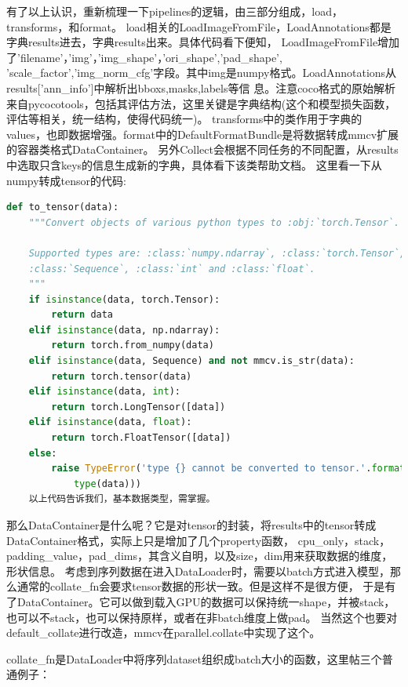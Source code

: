\documentclass[UTF8]{ctexart}
\begin{document}
有了以上认识，重新梳理一下pipelines的逻辑，由三部分组成，load，transforms，和format。
load相关的LoadImageFromFile，LoadAnnotations都是字典results进去，字典results出来。具体代码看下便知，
LoadImageFromFile增加了'filename'，'img'，'img\_shape'，'ori\_shape','pad\_shape',
'scale\_factor','img\_norm\_cfg'字段。其中img是numpy格式。LoadAnnotations从results['ann\_info']中解析出bboxs,masks,labels等信
息。注意coco格式的原始解析来自pycocotools，包括其评估方法，这里关键是字典结构(这个和模型损失函数，评估等相关，统一结构，使得代码统一)。
transforms中的类作用于字典的values，也即数据增强。format中的DefaultFormatBundle是将数据转成mmcv扩展的容器类格式DataContainer。
另外Collect会根据不同任务的不同配置，从results中选取只含keys的信息生成新的字典，具体看下该类帮助文档。
这里看一下从numpy转成tensor的代码:

\lstset{style=mystyle}
\begin{lstlisting}[language=Python]
def to_tensor(data):
    """Convert objects of various python types to :obj:`torch.Tensor`.

    Supported types are: :class:`numpy.ndarray`, :class:`torch.Tensor`,
    :class:`Sequence`, :class:`int` and :class:`float`.
    """
    if isinstance(data, torch.Tensor):
        return data
    elif isinstance(data, np.ndarray):
        return torch.from_numpy(data)
    elif isinstance(data, Sequence) and not mmcv.is_str(data):
        return torch.tensor(data)
    elif isinstance(data, int):
        return torch.LongTensor([data])
    elif isinstance(data, float):
        return torch.FloatTensor([data])
    else:
        raise TypeError('type {} cannot be converted to tensor.'.format(
			type(data)))
	以上代码告诉我们，基本数据类型，需掌握。
\end{lstlisting}

那么DataContainer是什么呢？它是对tensor的封装，将results中的tensor转成DataContainer格式，实际上只是增加了几个property函数，
cpu\_only，stack，padding\_value，pad\_dims，其含义自明，以及size，dim用来获取数据的维度，形状信息。
考虑到序列数据在进入DataLoader时，需要以batch方式进入模型，那么通常的collate\_fn会要求tensor数据的形状一致。但是这样不是很方便，
于是有了DataContainer。它可以做到载入GPU的数据可以保持统一shape，并被stack，也可以不stack，也可以保持原样，或者在非batch维度上做pad。
当然这个也要对default\_collate进行改造，mmcv在parallel.collate中实现了这个。

collate\_fn是DataLoader中将序列dataset组织成batch大小的函数，这里帖三个普通例子：
\end{document}
